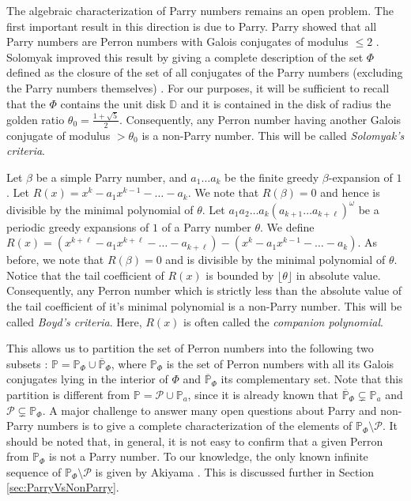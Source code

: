 \documentclass[12pt]{article}
\theoremstyle{plain}
\theoremstyle{remark}
\begin{document}
The algebraic characterization of Parry numbers remains an open problem. The first important result in this direction is due to Parry.  Parry showed that all Parry numbers are Perron numbers with Galois conjugates of modulus $\leq 2$ \cite{Par60}. Solomyak improved this result by giving a complete description of the set $\Phi$ defined as the closure of the set of all conjugates of the Parry numbers (excluding the Parry numbers themselves) \cite{Sol94}. For our purposes, it will be sufficient to recall that the $\Phi$ contains the unit disk $\mathbb{D}$ and it is contained in the disk of radius the golden ratio $\theta_0=\frac{1+\sqrt{5}}{2}$. Consequently, any Perron number having another Galois conjugate of modulus $>\theta_0$ is a non-Parry number. This will be called {\em Solomyak's criteria}.

Let $\beta$ be a simple Parry number, and $a_1 \dots a_k$ be the finite greedy $\beta$-expansion of $1$.
Let $R(x)= x^k - a_1 x^{k-1} - \dots - a_k$.
We note that $R(\beta) = 0$ and hence is divisible by the minimal polynomial of $\theta$.
Let $a_1 a_2 \dots a_k (a_{k+1} \dots a_{k+\ell})^\omega$ be a periodic greedy expansions of $1$ of a Parry number $\theta$.
We define $R(x) = \left(x^{k+\ell} - a_1 x^{k+\ell} - \dots - a_{k+\ell}\right) -
    \left(x^k - a_1 x^{k-1} - \dots - a_k\right)$.
As before, we note that $R(\beta) = 0$ and is divisible by the minimal polynomial of $\theta$.
Notice that the tail coefficient of $R(x)$ is bounded by $\lfloor \theta \rfloor$ in absolute value.
Consequently, any Perron number which is strictly less than the absolute value of the tail coefficient of it's minimal polynomial is a non-Parry number.
This will be called {\em Boyd's criteria}.
Here, $R(x)$ is often called the {\em companion polynomial}.

This allows us to partition the set of Perron numbers into the following two subsets : $\mathbb{P}=\mathbb{P}_\Phi\cup \overline{\mathbb{P}}_\Phi$, where $\mathbb{P}_\Phi$ is the set of Perron numbers with all its Galois conjugates lying in the interior of $\Phi$ and $\overline{\mathbb{P}}_\Phi$ its complementary set. Note that this partition is different from $\mathbb{P}=\mathcal{P}\cup \mathbb{P}_a$, since it is already known that $\overline{\mathbb{P}}_\Phi\subsetneq \mathbb{P}_a$ and $\mathcal{P}\subsetneq\mathbb{P}_\Phi$. A major challenge to answer many open questions about Parry and non-Parry numbers is to give a complete characterization of the elements of $\mathbb{P}_\Phi\setminus \mathcal{P}$. It should be noted that, in general, it is not easy to confirm that a given Perron from $\mathbb{P}_\Phi$ is not a Parry number. To our knowledge, the only known infinite sequence of $\mathbb{P}_\Phi\setminus \mathcal{P}$ is given by Akiyama \cite{Akiyama2016}. 
This is discussed further in Section \ref{sec:ParryVsNonParry}.
\end{document}
